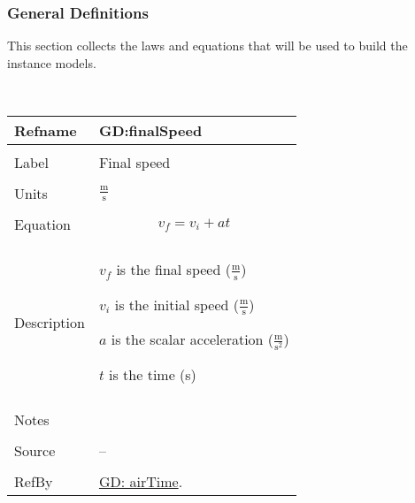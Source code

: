 \documentclass[12pt]{article}
\begin{document}
\subsubsection{General Definitions}
\label{Sec:GDs}
This section collects the laws and equations that will be used to build the instance models.
\par~

\noindent \begin{minipage}{\textwidth}
\begin{tabular}{p{} p{}}
\toprule \textbf{Refname} & \textbf{GD:finalSpeed}
\label{GD:finalSpeed}
\\ \midrule \\
Label & Final speed
\\ \midrule \\
Units & $\frac{\text{m}}{\text{s}}$
\\ \midrule \\
Equation & \begin{displaymath}
           {v_{f}}={v_{i}}+a t
           \end{displaymath}
\\ \midrule \\
Description & \begin{symbDescription}
              \item{${v_{f}}$ is the final speed ($\frac{\text{m}}{\text{s}}$)}
              \item{${v_{i}}$ is the initial speed ($\frac{\text{m}}{\text{s}}$)}
              \item{$a$ is the scalar acceleration ($\frac{\text{m}}{\text{s}^{2}}$)}
              \item{$t$ is the time (s)}
              \end{symbDescription}
\\ \midrule \\
Notes & 
\\ \midrule \\
Source & --
\\ \midrule \\
RefBy & \hyperref[GD:airTime]{GD: airTime}.
\\ \bottomrule \end{tabular}
\end{minipage}
\par~
\end{document}
